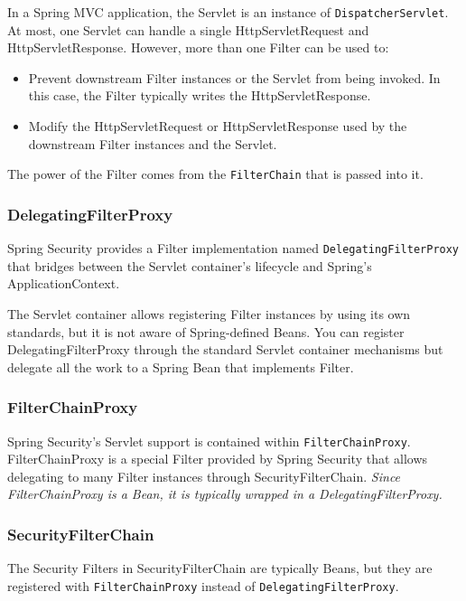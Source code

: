 \documentclass{scrartcl}
\begin{document}
In a Spring MVC application, the Servlet is an instance of \lstinline|DispatcherServlet|. At most, one Servlet can handle a single HttpServletRequest and HttpServletResponse. However, more than one Filter can be used to:

\begin{itemize}
    \item Prevent downstream Filter instances or the Servlet from being invoked. In this case, the Filter typically writes the HttpServletResponse.
    \item Modify the HttpServletRequest or HttpServletResponse used by the downstream Filter instances and the Servlet.
\end{itemize}

The power of the Filter comes from the \lstinline|FilterChain| that is passed into it.

\subsubsection{DelegatingFilterProxy}

Spring Security provides a Filter implementation named \lstinline|DelegatingFilterProxy| that bridges between the Servlet container’s lifecycle and Spring’s ApplicationContext.

The Servlet container allows registering Filter instances by using its own standards, but it is not aware of Spring-defined Beans. You can register DelegatingFilterProxy through the standard Servlet container mechanisms but delegate all the work to a Spring Bean that implements Filter.

\subsubsection{FilterChainProxy}

Spring Security’s Servlet support is contained within \lstinline|FilterChainProxy|.
FilterChainProxy is a special Filter provided by Spring Security that allows delegating to many Filter instances through SecurityFilterChain.
\textit{Since FilterChainProxy is a Bean, it is typically wrapped in a DelegatingFilterProxy.}

\subsubsection{SecurityFilterChain}

The Security Filters in SecurityFilterChain are typically Beans, but they are registered with \lstinline|FilterChainProxy| instead of \lstinline|DelegatingFilterProxy|.
\end{document}
